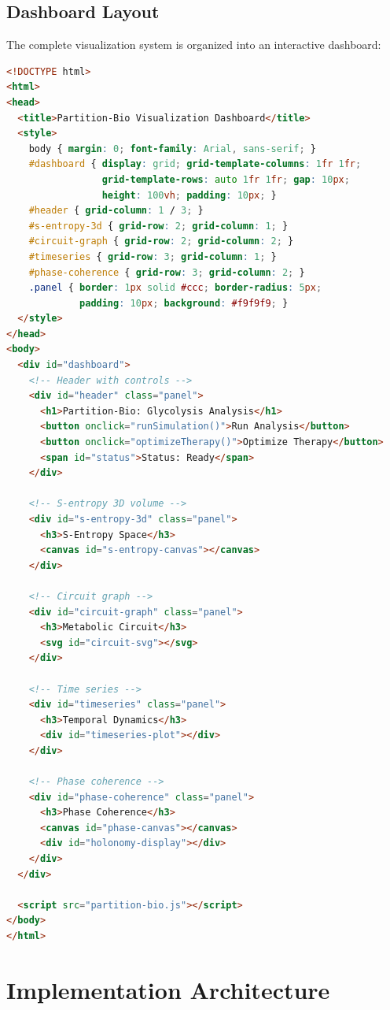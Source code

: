\documentclass[12pt,a4paper]{article}
\begin{document}
\subsection{Dashboard Layout}

The complete visualization system is organized into an interactive dashboard:

\begin{lstlisting}[language=HTML, basicstyle=\ttfamily\small]
<!DOCTYPE html>
<html>
<head>
  <title>Partition-Bio Visualization Dashboard</title>
  <style>
    body { margin: 0; font-family: Arial, sans-serif; }
    #dashboard { display: grid; grid-template-columns: 1fr 1fr; 
                 grid-template-rows: auto 1fr 1fr; gap: 10px; 
                 height: 100vh; padding: 10px; }
    #header { grid-column: 1 / 3; }
    #s-entropy-3d { grid-row: 2; grid-column: 1; }
    #circuit-graph { grid-row: 2; grid-column: 2; }
    #timeseries { grid-row: 3; grid-column: 1; }
    #phase-coherence { grid-row: 3; grid-column: 2; }
    .panel { border: 1px solid #ccc; border-radius: 5px; 
             padding: 10px; background: #f9f9f9; }
  </style>
</head>
<body>
  <div id="dashboard">
    <!-- Header with controls -->
    <div id="header" class="panel">
      <h1>Partition-Bio: Glycolysis Analysis</h1>
      <button onclick="runSimulation()">Run Analysis</button>
      <button onclick="optimizeTherapy()">Optimize Therapy</button>
      <span id="status">Status: Ready</span>
    </div>
    
    <!-- S-entropy 3D volume -->
    <div id="s-entropy-3d" class="panel">
      <h3>S-Entropy Space</h3>
      <canvas id="s-entropy-canvas"></canvas>
    </div>
    
    <!-- Circuit graph -->
    <div id="circuit-graph" class="panel">
      <h3>Metabolic Circuit</h3>
      <svg id="circuit-svg"></svg>
    </div>
    
    <!-- Time series -->
    <div id="timeseries" class="panel">
      <h3>Temporal Dynamics</h3>
      <div id="timeseries-plot"></div>
    </div>
    
    <!-- Phase coherence -->
    <div id="phase-coherence" class="panel">
      <h3>Phase Coherence</h3>
      <canvas id="phase-canvas"></canvas>
      <div id="holonomy-display"></div>
    </div>
  </div>
  
  <script src="partition-bio.js"></script>
</body>
</html>
\end{lstlisting}

\section{Implementation Architecture}
\end{document}
